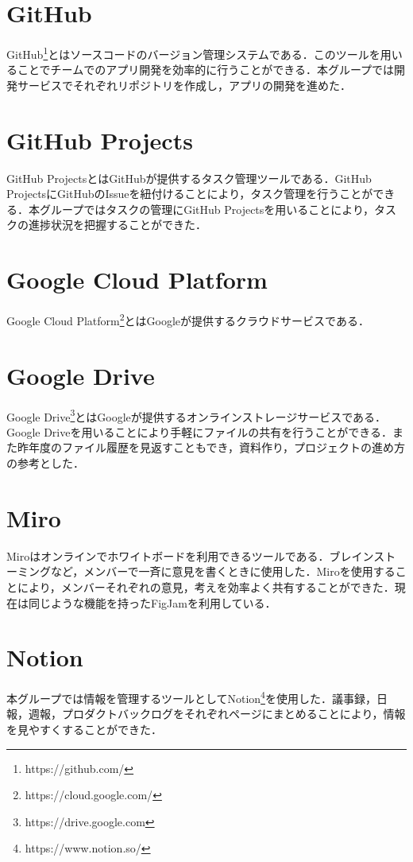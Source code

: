 \section{GitHub}
GitHub\footnote{https://github.com/}とはソースコードのバージョン管理システムである．このツールを用いることでチームでのアプリ開発を効率的に行うことができる．本グループでは開発サービスでそれぞれリポジトリを作成し，アプリの開発を進めた．

\section{GitHub Projects}
GitHub ProjectsとはGitHubが提供するタスク管理ツールである．GitHub ProjectsにGitHubのIssueを紐付けることにより，タスク管理を行うことができる．本グループではタスクの管理にGitHub Projectsを用いることにより，タスクの進捗状況を把握することができた．

\section{Google Cloud Platform}
Google Cloud Platform\footnote{https://cloud.google.com/}とはGoogleが提供するクラウドサービスである．

\section{Google Drive}
Google Drive\footnote{https://drive.google.com}とはGoogleが提供するオンラインストレージサービスである．Google Driveを用いることにより手軽にファイルの共有を行うことができる．また昨年度のファイル履歴を見返すこともでき，資料作り，プロジェクトの進め方の参考とした．

\section{Miro}
Miroはオンラインでホワイトボードを利用できるツールである．ブレインストーミングなど，メンバーで一斉に意見を書くときに使用した．Miroを使用することにより，メンバーそれぞれの意見，考えを効率よく共有することができた．現在は同じような機能を持ったFigJamを利用している．

\pagebreak
\section{Notion}
本グループでは情報を管理するツールとしてNotion\footnote{https://www.notion.so/}を使用した．議事録，日報，週報，プロダクトバックログをそれぞれページにまとめることにより，情報を見やすくすることができた．


